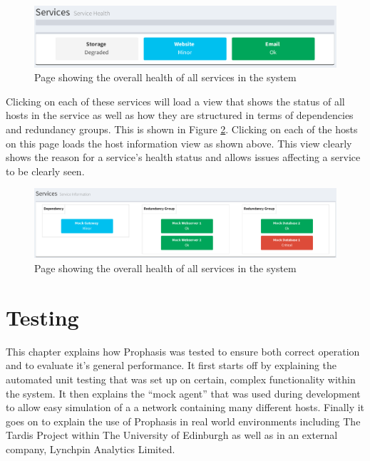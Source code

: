 \documentclass[bsc,logo,twoside,parskip,singlespacing,notimes]{infthesis}
\begin{document}
\begin{figure}[H]
	\centering
	\caption{Page showing the overall health of all services in the system}
	\label{service-health-index}
	\includegraphics[scale=0.6]{assets/screenshots/service-health-index.pdf}
\end{figure}


	Clicking on each of these services will load a view that shows the status of
	all hosts in the service as well as how they are structured in terms of
	dependencies and redundancy groups.  This is shown in Figure
	\ref{service-information}.  Clicking on each of the hosts on this page loads
	the host information view as shown above.  This view clearly shows the reason
	for a service's health status and allows issues affecting a service to be
	clearly seen.

\begin{figure}[H]
	\centering
	\caption{Page showing the overall health of all services in the system}
	\label{service-information}
	\includegraphics[scale=0.44]{assets/screenshots/service-information.pdf}
\end{figure}


\chapter{Testing}
	This chapter explains how Prophasis was tested to ensure both correct operation
	and to evaluate it's general performance.  It first starts off by explaining
	the automated unit testing that was set up on certain, complex functionality
	within the system.  It then explains the ``mock agent'' that was used during
	development to allow easy simulation of a a network containing many different
	hosts.  Finally it goes on to explain the use of Prophasis in real world 
	environments including The Tardis Project within The University of Edinburgh
	as well as in an external company, Lynchpin Analytics Limited.
\end{document}
